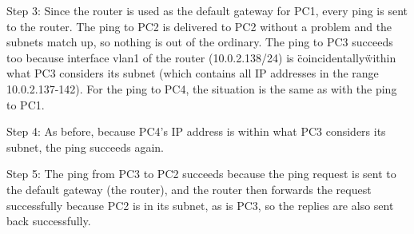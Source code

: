 Step 3:
Since the router is used as the default gateway for PC1, every ping is sent to the router. The ping to PC2 is delivered to PC2 without a problem and the subnets match up, so nothing is out of the ordinary. The ping to PC3 succeeds too because interface vlan1 of the router (10.0.2.138/24) is \"coincidentally\" within what PC3 considers its subnet (which contains all IP addresses in the range 10.0.2.137-142). For the ping to PC4, the situation is the same as with the ping to PC1.

Step 4:
As before, because PC4's IP address is within what PC3 considers its subnet, the ping succeeds again.

Step 5:
The ping from PC3 to PC2 succeeds because the ping request is sent to the default gateway (the router), and the router then forwards the request successfully because PC2 is in its subnet, as is PC3, so the replies are also sent back successfully.